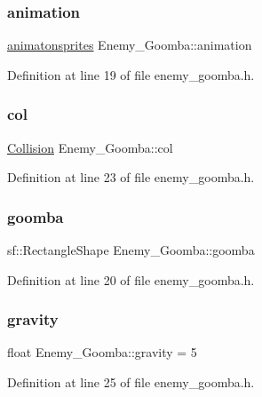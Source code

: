 \subsubsection{\texorpdfstring{animation}{animation}}
{\footnotesize\ttfamily \hyperlink{classanimatonsprites}{animatonsprites} Enemy\+\_\+\+Goomba\+::animation}



Definition at line 19 of file enemy\+\_\+goomba.\+h.

\hypertarget{class_enemy___goomba_a435110bcd5fc30fd2ff0a0d9347c49f3}{}\label{class_enemy___goomba_a435110bcd5fc30fd2ff0a0d9347c49f3} 
\subsubsection{\texorpdfstring{col}{col}}
{\footnotesize\ttfamily \hyperlink{class_collision}{Collision} Enemy\+\_\+\+Goomba\+::col}



Definition at line 23 of file enemy\+\_\+goomba.\+h.

\hypertarget{class_enemy___goomba_a06e972cccfe94936721859c90729d3f3}{}\label{class_enemy___goomba_a06e972cccfe94936721859c90729d3f3} 
\subsubsection{\texorpdfstring{goomba}{goomba}}
{\footnotesize\ttfamily sf\+::\+Rectangle\+Shape Enemy\+\_\+\+Goomba\+::goomba}



Definition at line 20 of file enemy\+\_\+goomba.\+h.

\hypertarget{class_enemy___goomba_a04e563eef4eda0f20083576ceed3669a}{}\label{class_enemy___goomba_a04e563eef4eda0f20083576ceed3669a} 
\subsubsection{\texorpdfstring{gravity}{gravity}}
{\footnotesize\ttfamily float Enemy\+\_\+\+Goomba\+::gravity = 5}



Definition at line 25 of file enemy\+\_\+goomba.\+h.

